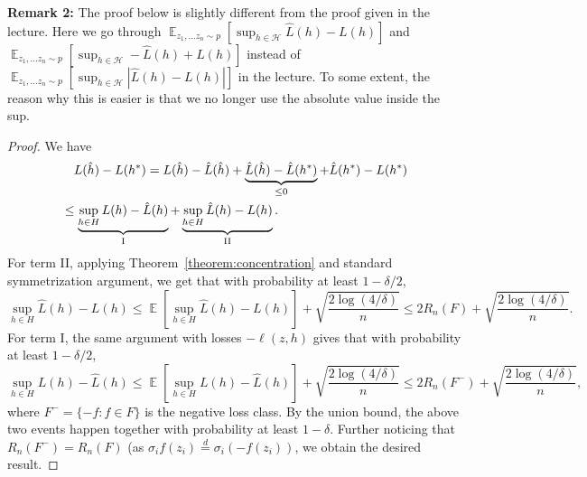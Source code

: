 \documentclass[11pt]{article}
\DeclareMathOperator*{\E}{\mathbb{E}}
\begin{document}
{\bf Remark 2: } The proof below is slightly different from the proof given in the lecture. Here we go through $ \E_{z_1,...z_n \sim p} \left[\sup_{h\in\mathcal{H}} \hat{L}(h)-L(h)\right]
$  and $ \E_{z_1,...z_n \sim p} \left[\sup_{h\in\mathcal{H}} -\hat{L}(h)+L(h)\right]
$ instead of $ \E_{z_1,...z_n \sim p} \left[\sup_{h\in\mathcal{H}} |\hat{L}(h)-L(h)|\right]
$ in the lecture. To some extent, the reason why this is easier is that we no longer use the absolute value inside the sup. 
\begin{proof}
  We have
  \begin{align*}
    & \quad L(\hat{h}) - L(h^*) = L(\hat{h}) - \hat{L}(\hat{h}) + \underbrace{\hat{L}(\hat{h}) - \hat{L}(h^*)}_{\le 0} + \hat{L}(h^*) - L(h^*) \\
    & \le \underbrace{\sup_{h\in H}L(h) - \hat{L}(h)}_{\rm I} +
      \underbrace{\sup_{h\in H}\hat{L}(h) - L(h)}_{\rm II}. 
  \end{align*}
  For term II, applying Theorem~\ref{theorem:concentration} and standard symmetrization argument, we get that with probability at least $1-\delta/2$,
  \begin{equation*}
    \sup_{h\in H}\hat{L}(h) - L(h) \le \E\left[\sup_{h\in H}\hat{L}(h) - L(h)\right] + \sqrt{\frac{2\log(4/\delta)}{n}} \le 2R_n(F) + \sqrt{\frac{2\log(4/\delta)}{n}}.
  \end{equation*}
  For term I, the same argument with losses $-\ell(z,h)$ gives that with probability at least $1-\delta/2$,
  \begin{equation*}
    \sup_{h\in H}L(h) - \hat{L}(h) \le \E\left[\sup_{h\in H}L(h) - \hat{L}(h)\right] + \sqrt{\frac{2\log(4/\delta)}{n}} \le 2R_n(F^-) + \sqrt{\frac{2\log(4/\delta)}{n}},
  \end{equation*}
  where $F^-=\{-f:f\in F\}$ is the negative loss class.
  By the union bound, the above two events happen together with
  probability at least $1-\delta$. Further noticing that
  $R_n(F^-)=R_n(F)$ (as
  $\sigma_if(z_i)\stackrel{d}{=}\sigma_i(-f(z_i))$, we obtain the
  desired result.
\end{proof}


\end{document}

